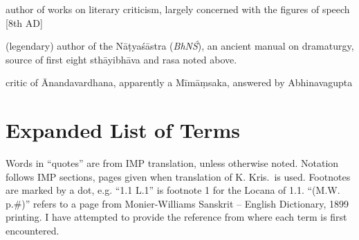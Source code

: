 \documentclass[12pt]{article}
\begin{document}
\begin{description}
	\setlength{\itemsep}{-0.25em}

	\item[Bhāmaha] author of works on literary criticism, largely concerned with the figures of speech [8th AD]

	\item[Bharata] (legendary) author of the Nāṭyaśāstra (\textit{BhNŚ}), an ancient manual on dramaturgy, source of first eight sthāyibhāva and rasa noted above.

	\item[Bhattanayaka] critic of Ānandavardhana, apparently a Mīmāṃsaka, answered by Abhinavagupta
\end{description}


\newpage


\section{Expanded List of Terms}

Words in ``quotes'' are from IMP translation, unless otherwise noted.
Notation follows IMP sections, pages given when translation of K. Kris.\ is used.
Footnotes are marked by a dot, e.g. ``1.1 L.1'' is footnote 1 for the Locana of 1.1.
``(M.W. p.\#)'' refers to a page from Monier-Williams Sanskrit -- English Dictionary, 1899 printing.
I have attempted to provide the reference from where each term is first encountered.



\newcommand\litem[1]{\item{\bfseries #1\label{#1}}}
\end{document}
